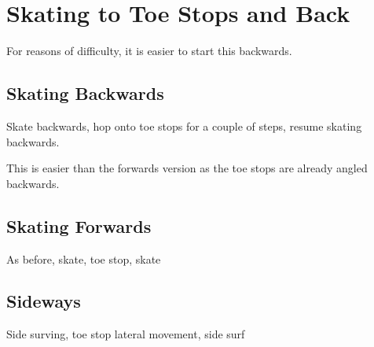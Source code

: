 \section{Skating to Toe Stops and Back}
\label{sec:toe_stop/skating_to_toe}

For reasons of difficulty, it is easier to start this backwards. 


\subsection{Skating Backwards}
Skate backwards, hop onto toe stops for a couple of steps, resume skating backwards.


This is easier than the forwards version as the toe stops are already angled backwards. 


\subsection{Skating Forwards}
As before, skate, toe stop, skate


\subsection{Sideways}

Side surving, toe stop lateral movement, side surf
